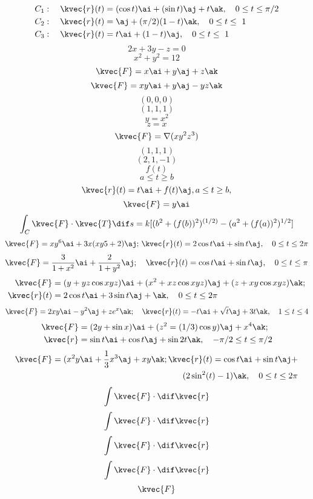 \begin{align*}
 C_{1}:\quad\kvec{r}(t)&=(\cos t)\ai+(\sin t)\aj+t\ak,\quad0\le t \le\pi/2\\
 C_{2}:\quad\kvec{r}(t)&=\aj+(\pi/2)(1-t)\ak,\quad 0\le t \le\ 1\\
 C_{3}:\quad\kvec{r}(t)&=t\ai+(1-t)\aj,\quad 0 \le t \le\ 1
\end{align*} 
\[ 2x +3y-z = 0\]
\[x^{2}+y^{2}=12 \]
\[\kvec{F} = x\ai +y\aj + z\ak \]
\[ \kvec{F} = xy\ai + y\aj -yz\ak\]
\[ (0,0,0)\]
\[(1,1,1)\]
\[ y=x^{2}\]
\[z=x\]
\[ \kvec{F} =\nabla (xy^{2}z^{3})\]
\[ (1,1,1)\]
\[ (2,1,-1)\]
\[ f(t)\]
\[ a\le t\ge b\]
\[ \kvec{r}(t) =t\ai+ f(t)\aj , a\le t \ge b,\]
\[ \kvec{F} =y\ai \] 
\begin{align*}
\int_{C}\kvec{F}\cdot\kvec{T}\dif s=k[(b^{2}+(f(b))^{2})^{(1/2)}-(a^{2}+(f(a))^{2})^{1/2}]
\end{align*}
\begin{align*}
\kvec{F}=xy^{6}\ai+3x(xy{5}+2)\aj;\, \kvec{r}(t)=2\cos t \ai+\sin t \aj,\quad 0\le t\le 2\pi
\end{align*}
\begin{align*}
\kvec{F}=\frac{3}{1+x^{2}}\ai + \frac{2}{1+y^{2}}\aj;\quad \kvec{r}(t)=\cos t\ai + \sin t\aj, \quad 0\le t \le \pi
\end{align*}
\begin{align*}
\kvec{F}&=(y+yz \cos xyz)\ai +(x^{2} +xz \cos xyz)\aj +(z+xy \cos xyz)\ak ; \\ \kvec{r}(t)&=2 \cos t \ai +3 \sin t \aj +\ak ,\quad 0 \le t \le 2\pi
\end{align*}
\begin{align*}
\kvec{F}=2xy\ai-y^{2}\aj+ze^{x}\ak;\quad\kvec{r}(t)=-t\ai+\sqrt{t}\aj+3t\ak,\quad 1 \le t \le 4
\end{align*}
\begin{align*}
\kvec{F}&=(2y+\sin x)\ai +(z^{2}=(1/3) \cos y)\aj + x^{4}\ak;\\
\kvec{r}&=\sin t\ai +\cos t \aj +\sin 2t\ak,\quad -\pi/2 \le t \le \pi/2
\end{align*}
\begin{align*}
\kvec{F}=(x^{2}y\ai+ \frac{1}{3}x^{3}\aj+xy\ak;\kvec{r}(t)=\cos t\ai+ \sin t \aj+\\
(2 \sin^{2}(t)-1)\ak,\quad 0 \le t \le 2\pi
\end{align*}
\[\int \kvec{F} \cdot \dif \kvec{r}\]
\[\int \kvec{F} \cdot \dif \kvec{r}\]
\[\int \kvec{F} \cdot \dif \kvec{r}\]
\[\int \kvec{F} \cdot \dif \kvec{r}\]
\[\kvec{F}\]
